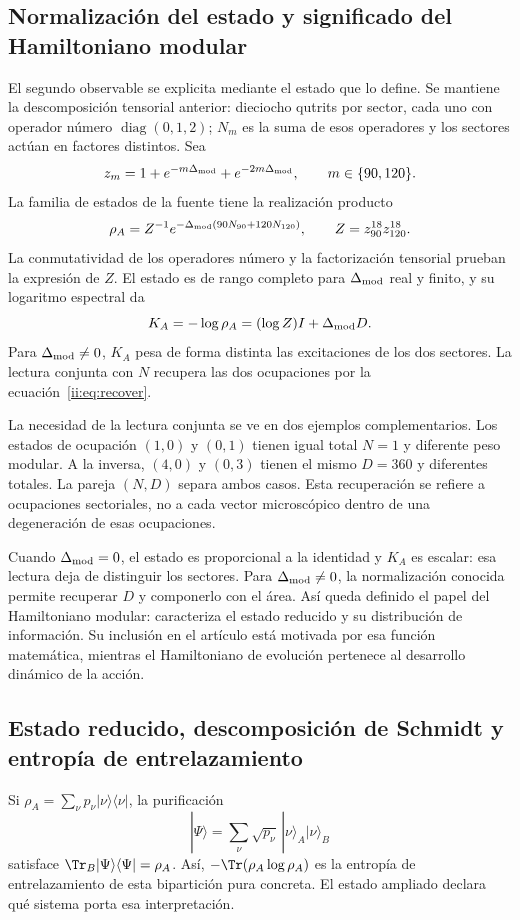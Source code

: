 \subsection{Normalización del estado y significado del Hamiltoniano modular}
El segundo observable se explicita mediante el estado que lo define.
Se mantiene la descomposición tensorial anterior: dieciocho qutrits
por sector, cada uno con operador número $\operatorname{diag}(0,1,2)$;
$N_m$ es la suma de esos operadores y los sectores actúan en factores
distintos. Sea
\[
 z_m=1+e^{-m\Delta_{\rm mod}}+e^{-2m\Delta_{\rm mod}},
 \qquad m\in\{90,120\}.
\]
La familia de estados de la fuente tiene la realización producto
\[
 \rho_A=Z^{-1}e^{-\Delta_{\rm mod}(90N_{90}+120N_{120})},
 \qquad Z=z_{90}^{18}z_{120}^{18}.
\]
La conmutatividad de los operadores número y la factorización tensorial
prueban la expresión de $Z$. El estado es de rango completo para
$\Delta_{\rm mod}$ real y finito, y su logaritmo espectral da
\[
 K_A=-\log\rho_A=(\log Z)I+\Delta_{\rm mod}D.
\]
Para $\Delta_{\rm mod}\ne0$, $K_A$ pesa de forma distinta las excitaciones
de los dos sectores. La lectura conjunta con $N$ recupera las dos ocupaciones
por la ecuación~\eqref{ii:eq:recover}.

La necesidad de la lectura conjunta se ve en dos ejemplos complementarios.
Los estados de ocupación $(1,0)$ y $(0,1)$ tienen igual total $N=1$
y diferente peso modular. A la inversa, $(4,0)$ y $(0,3)$ tienen
el mismo $D=360$ y diferentes totales. La pareja $(N,D)$ separa ambos
casos. Esta recuperación se refiere a ocupaciones sectoriales, no a
cada vector microscópico dentro de una degeneración de esas ocupaciones.

Cuando $\Delta_{\rm mod}=0$, el estado es proporcional a la identidad
y $K_A$ es escalar: esa lectura deja de distinguir los sectores.
Para $\Delta_{\rm mod}\ne0$, la normalización conocida permite recuperar
$D$ y componerlo con el área. Así queda definido el papel del Hamiltoniano
modular: caracteriza el estado reducido y su distribución de información.
Su inclusión en el artículo está motivada por esa función matemática,
mientras el Hamiltoniano de evolución pertenece al desarrollo dinámico
de la acción.



\subsection{Estado reducido, descomposición de Schmidt y entropía de entrelazamiento}
Si $\rho_A=\sum_\nu p_\nu|\nu\rangle\langle\nu|$,
la purificación
\[
|\Psi\rangle=\sum_\nu\sqrt{p_\nu}\,
|\nu\rangle_A|\nu\rangle_B
\]
satisface $\Tr_B|\Psi\rangle\langle\Psi|=\rho_A$.
Así, $-\Tr(\rho_A\log\rho_A)$ es la entropía de entrelazamiento
de esta bipartición pura concreta. El estado ampliado declara
qué sistema porta esa interpretación.

